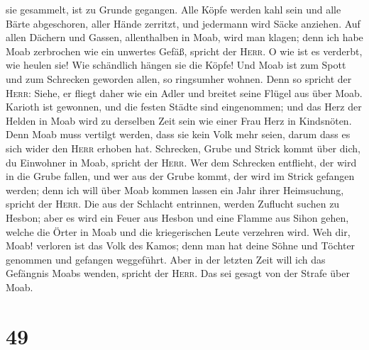 sie gesammelt, ist zu Grunde gegangen.  Alle Köpfe werden
kahl sein und alle Bärte abgeschoren, aller Hände zerritzt, und
jedermann wird Säcke anziehen.  Auf allen Dächern und
Gassen, allenthalben in Moab, wird man klagen; denn ich habe Moab
zerbrochen wie ein unwertes Gefäß, spricht der \textsc{Herr}.
 O wie ist es verderbt, wie heulen sie! Wie schändlich
hängen sie die Köpfe! Und Moab ist zum Spott und zum Schrecken geworden
allen, so ringsumher wohnen.  Denn so spricht der
\textsc{Herr}: Siehe, er fliegt daher wie ein Adler und breitet seine
Flügel aus über Moab.  Karioth ist gewonnen, und die
festen Städte sind eingenommen; und das Herz der Helden in Moab wird zu
derselben Zeit sein wie einer Frau Herz in Kindsnöten. 
Denn Moab muss vertilgt werden, dass sie kein Volk mehr seien, darum
dass es sich wider den \textsc{Herr} erhoben hat. 
Schrecken, Grube und Strick kommt über dich, du Einwohner in Moab,
spricht der \textsc{Herr}.  Wer dem Schrecken entflieht,
der wird in die Grube fallen, und wer aus der Grube kommt, der wird im
Strick gefangen werden; denn ich will über Moab kommen lassen ein Jahr
ihrer Heimsuchung, spricht der \textsc{Herr}.  Die aus
der Schlacht entrinnen, werden Zuflucht suchen zu Hesbon; aber es wird
ein Feuer aus Hesbon und eine Flamme aus Sihon gehen, welche die Örter
in Moab und die kriegerischen Leute verzehren wird.  Weh
dir, Moab! verloren ist das Volk des Kamos; denn man hat deine Söhne und
Töchter genommen und gefangen weggeführt.  Aber in der
letzten Zeit will ich das Gefängnis Moabs wenden, spricht der
\textsc{Herr}. Das sei gesagt von der Strafe über Moab.

\hypertarget{section-48}{%
\section{49}\label{section-48}}

